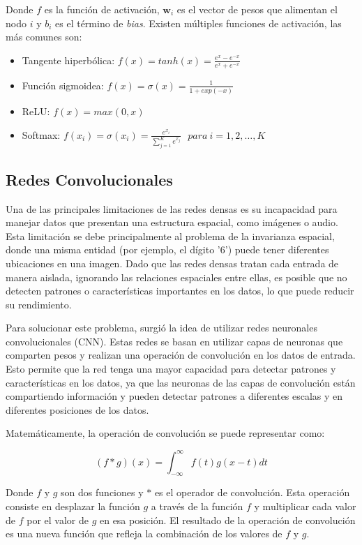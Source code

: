 Donde $f$ es la función de activación, $\mathbf{w}_i$ es el vector de pesos que alimentan el nodo $i$ y $b_i$ es el
término de {\it bias}. Existen múltiples funciones de activación, las más comunes son:

\begin{itemize}
  \item Tangente hiperbólica: $f(x) = tanh(x) = \frac{e^x - e^{-x}}{e^x + e^{-x}}$
  \item Función sigmoidea: $f(x) = \sigma(x) = \frac{1}{1+exp(-x)}$
  \item ReLU: $f(x) = max(0, x)$
  \item Softmax: $f(x_i) = \sigma(x_i) = \frac{e^{x_{i}}}{\sum_{j=1}^K e^{x_{j}}} \ \ \ para\ i=1,2,\dots,K$
\end{itemize}

\subsection{Redes Convolucionales}
Una de las principales limitaciones de las redes densas es su incapacidad para manejar datos que presentan una
estructura espacial, como imágenes o audio. Esta limitación se debe principalmente al problema de la invarianza
espacial, donde una misma entidad (por ejemplo, el dígito '6') puede tener diferentes ubicaciones en una imagen. Dado
que las redes densas tratan cada entrada de manera aislada, ignorando las relaciones espaciales entre ellas, es posible
que no detecten patrones o características importantes en los datos, lo que puede reducir su rendimiento.

Para solucionar este problema, surgió la idea de utilizar redes neuronales convolucionales (CNN). Estas redes se basan
en utilizar capas de neuronas que comparten pesos y realizan una operación de convolución en los datos de entrada. Esto
permite que la red tenga una mayor capacidad para detectar patrones y características en los datos, ya que las neuronas
de las capas de convolución están compartiendo información y pueden detectar patrones a diferentes escalas y en
diferentes posiciones de los datos.

Matemáticamente, la operación de convolución se puede representar como:

\begin{equation}
  (f * g)(x) = \int_{-\infty}^{\infty} f(t)g(x-t) dt
  \label{eq:convolucion}
\end{equation}

Donde $f$ y $g$ son dos funciones y $*$ es el operador de convolución. Esta operación consiste en desplazar la función
$g$ a través de la función $f$ y multiplicar cada valor de $f$ por el valor de $g$ en esa posición. El resultado de la
operación de convolución es una nueva función que refleja la combinación de los valores de $f$ y $g$.

